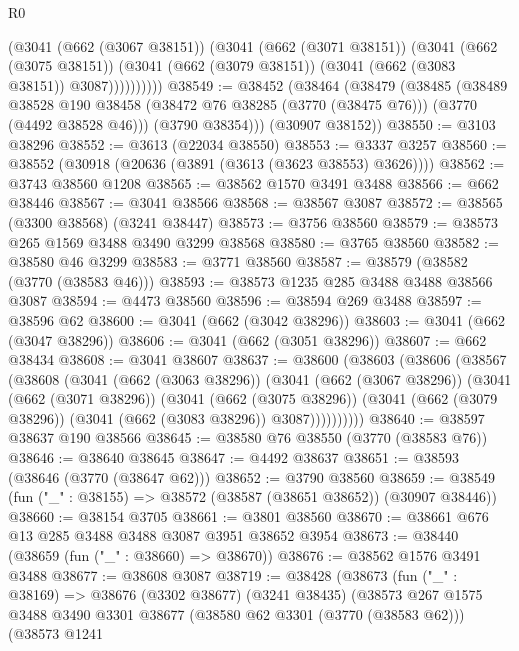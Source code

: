 \begin{lexlean}{R0}
\begin{coremodule}
              (@3041
                (@662 (@3067 @38151))
                (@3041
                  (@662 (@3071 @38151))
                  (@3041
                    (@662 (@3075 @38151))
                    (@3041 (@662 (@3079 @38151)) (@3041 (@662 (@3083 @38151)) @3087))))))))))
@38549 := @38452
    (@38464
      (@38479
        (@38485
          (@38489
            @38528
            @190
            @38458
            (@38472 @76 @38285 (@3770 (@38475 @76)))
            (@3770 (@4492 @38528 @46)))
          (@3790 @38354)))
      (@30907 @38152))
@38550 := @3103 @38296
@38552 := @3613 (@22034 @38550)
@38553 := @3337 @3257
@38560 := @38552 (@30918 (@20636 (@3891 (@3613 (@3623 @38553) @3626))))
@38562 := @3743 @38560 @1208
@38565 := @38562 @1570 @3491 @3488
@38566 := @662 @38446
@38567 := @3041 @38566
@38568 := @38567 @3087
@38572 := @38565 (@3300 @38568) (@3241 @38447)
@38573 := @3756 @38560
@38579 := @38573 @265 @1569 @3488 @3490 @3299 @38568
@38580 := @3765 @38560
@38582 := @38580 @46 @3299
@38583 := @3771 @38560
@38587 := @38579 (@38582 (@3770 (@38583 @46)))
@38593 := @38573 @1235 @285 @3488 @3488 @38566 @3087
@38594 := @4473 @38560
@38596 := @38594 @269 @3488
@38597 := @38596 @62
@38600 := @3041 (@662 (@3042 @38296))
@38603 := @3041 (@662 (@3047 @38296))
@38606 := @3041 (@662 (@3051 @38296))
@38607 := @662 @38434
@38608 := @3041 @38607
@38637 := @38600
    (@38603
      (@38606
        (@38567
          (@38608
            (@3041
              (@662 (@3063 @38296))
              (@3041
                (@662 (@3067 @38296))
                (@3041
                  (@662 (@3071 @38296))
                  (@3041
                    (@662 (@3075 @38296))
                    (@3041 (@662 (@3079 @38296)) (@3041 (@662 (@3083 @38296)) @3087))))))))))
@38640 := @38597 @38637 @190 @38566
@38645 := @38580 @76 @38550 (@3770 (@38583 @76))
@38646 := @38640 @38645
@38647 := @4492 @38637
@38651 := @38593 (@38646 (@3770 (@38647 @62)))
@38652 := @3790 @38560
@38659 := @38549 (fun ("_" : @38155) => @38572 (@38587 (@38651 @38652)) (@30907 @38446))
@38660 := @38154 @3705
@38661 := @3801 @38560
@38670 := @38661 @676 @13 @285 @3488 @3488 @3087 @3951 @38652 @3954
@38673 := @38440 (@38659 (fun ("_" : @38660) => @38670))
@38676 := @38562 @1576 @3491 @3488
@38677 := @38608 @3087
@38719 := @38428
    (@38673
      (fun ("_" : @38169) =>
      @38676
        (@3302 @38677)
        (@3241 @38435)
        (@38573
          @267
          @1575
          @3488
          @3490
          @3301
          @38677
          (@38580 @62 @3301 (@3770 (@38583 @62)))
          (@38573
            @1241

\end{coremodule}
\end{lexlean}
